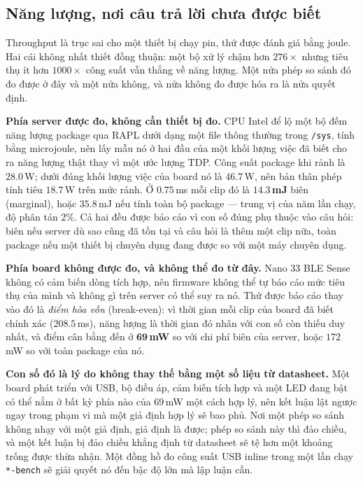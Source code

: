 \documentclass[11pt]{article}
\begin{document}
\subsection{Năng lượng, nơi câu trả lời chưa được biết}
\label{sec:firmware-energy}

Throughput là trục sai cho một thiết bị chạy pin, thứ được đánh giá bằng
joule. Hai cái không nhất thiết đồng thuận: một bộ xử lý chậm hơn
$276\times$ nhưng tiêu thụ ít hơn $1000\times$ công suất vẫn thắng về năng
lượng. Một nửa phép so sánh đó đo được ở đây và một nửa không, và nửa
không đo được hóa ra là nửa quyết định.

\textbf{Phía server được đo, không cần thiết bị đo.} CPU Intel để lộ một
bộ đếm năng lượng package qua RAPL dưới dạng một file thông thường trong
\texttt{/sys}, tính bằng microjoule, nên lấy mẫu nó ở hai đầu của một
khối lượng việc đã biết cho ra năng lượng thật thay vì một ước lượng TDP.
Công suất package khi rảnh là $28.0$\,W; dưới đúng khối lượng việc của
board nó là $46.7$\,W, nên bản thân phép tính tiêu $18.7$\,W trên mức
rảnh. Ở $0.75$\,ms mỗi clip đó là $\mathbf{14.3}$\,\textbf{mJ} biên
(marginal), hoặc $35.8$\,mJ nếu tính toàn bộ package --- trung vị của năm
lần chạy, độ phân tán $2\%$. Cả hai đều được báo cáo vì con số đúng phụ
thuộc vào câu hỏi: biên nếu server dù sao cũng đã tồn tại và câu hỏi là
thêm một clip nữa, toàn package nếu một thiết bị chuyên dụng đang được so
với một máy chuyên dụng.

\textbf{Phía board không được đo, và không thể đo từ đây.} Nano 33 BLE
Sense không có cảm biến dòng tích hợp, nên firmware không thể tự báo cáo
mức tiêu thụ của mình và không gì trên server có thể suy ra nó. Thứ được
báo cáo thay vào đó là \emph{điểm hòa vốn} (break-even): vì thời gian mỗi
clip của board đã biết chính xác ($208.5$\,ms), năng lượng là thời gian đó
nhân với con số còn thiếu duy nhất, và điểm cân bằng đến ở
$\mathbf{69}$\,\textbf{mW} so với chi phí biên của server, hoặc $172$\,mW
so với toàn package của nó.

\textbf{Con số đó là lý do không thay thế bằng một số liệu từ datasheet.}
Một board phát triển với USB, bộ điều áp, cảm biến tích hợp và một LED
đang bật có thể nằm ở bất kỳ phía nào của $69$\,mW một cách hợp lý, nên
kết luận lật ngược ngay trong phạm vi mà một giả định hợp lý sẽ bao phủ.
Nơi một phép so sánh không nhạy với một giả định, giả định là được; phép
so sánh này thì đảo chiều, và một kết luận bị đảo chiều khẳng định từ
datasheet sẽ tệ hơn một khoảng trống được thừa nhận. Một đồng hồ đo công
suất USB inline trong một lần chạy \texttt{*-bench} sẽ giải quyết nó đến
bậc độ lớn mà lập luận cần.
\end{document}
